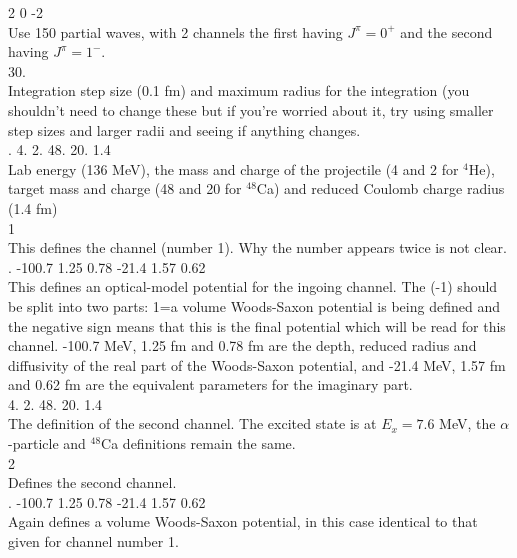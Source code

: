 \documentclass[a4paper,10pt]{article}
\begin{document}
  2  0 -2\\
Use 150 partial waves, with 2 channels the first having $J^\pi = 0^+$ and the second having $J^\pi = 1^-$.\\

     30.\\
Integration step size (0.1 fm) and maximum radius for the integration (you shouldn't need to change these but if you're worried about it, try using smaller step sizes and larger radii and seeing if anything changes.\\

.    4.      2.      48.     20.     1.4\\
Lab energy (136 MeV), the mass and charge of the projectile (4 and 2 for $^4$He), target mass and charge (48 and 20 for $^{48}$Ca) and reduced Coulomb charge radius (1.4 fm)\\

  1\\
This defines the channel (number 1). Why the number appears twice is not clear.\\
  
.     -100.7  1.25    0.78            -21.4   1.57    0.62\\
This defines an optical-model potential for the ingoing channel. The (-1) should be split into two parts: 1=a volume Woods-Saxon potential is being defined and the negative sign means that this is the final potential which will be read for this channel. -100.7 MeV, 1.25 fm and 0.78 fm are the depth, reduced radius and diffusivity of the real part of the Woods-Saxon potential, and -21.4 MeV, 1.57 fm and 0.62 fm are the equivalent parameters for the imaginary part.\\

  4.      2.      48.     20.     1.4\\
The definition of the second channel. The excited state is at $E_x = 7.6$ MeV, the $\alpha$-particle and $^{48}$Ca definitions remain the same.\\

  2\\
Defines the second channel.\\
  
.     -100.7  1.25    0.78            -21.4   1.57    0.62\\
Again defines a volume Woods-Saxon potential, in this case identical to that given for channel number 1.\\
\end{document}
